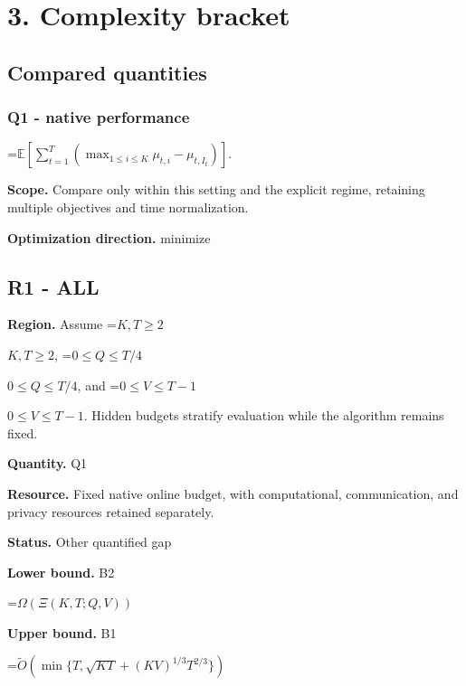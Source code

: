 \documentclass[10pt,a4paper]{article}
\newcommand{\AtlasMath}[1]{\par\begingroup\centering\setbox0=\hbox{$\displaystyle #1$}\ifdim\wd0>1.4\linewidth\typeout{ATLAS WIDE FORMULA: \the\wd0}\fi\ifdim\wd0>\linewidth\resizebox{\linewidth}{!}{\box0}\else\box0\fi\par\endgroup}
\newcommand{\AtlasInlineMath}[1]{\begingroup\setbox0=\hbox{$#1$}\ifdim\wd0>.4\linewidth\endgroup\AtlasMath{#1}\else\endgroup$#1$\fi}
\begin{document}
\section{3. Complexity bracket}


\subsection{Compared quantities}


\subsubsection{Q1 - native performance}


\AtlasMath{\mathbb E\!\left[\sum_{t=1}^{T}\left(\max_{1\le i\le K}\mu_{t,i}-\mu_{t,I_t}\right)\right].}


\textbf{Scope.} Compare only within this setting and the explicit regime, retaining multiple objectives and time normalization.



\textbf{Optimization direction.} minimize



\subsection{R1 - ALL}


\textbf{Region.} Assume \AtlasInlineMath{K,T\ge2}, \AtlasInlineMath{0\le Q\le T/4}, and \AtlasInlineMath{0\le V\le T-1}. Hidden budgets stratify evaluation while the algorithm remains fixed.



\textbf{Quantity.} Q1



\textbf{Resource.} Fixed native online budget, with computational, communication, and privacy resources retained separately.



\textbf{Status.} Other quantified gap



\textbf{Lower bound.} B2



\AtlasMath{\Omega(\Xi(K,T;Q,V))}


\textbf{Upper bound.} B1



\AtlasMath{\widetilde{O}(\min\{T,\sqrt{KT}+(KV)^{1/3}T^{2/3}\})}
\end{document}
